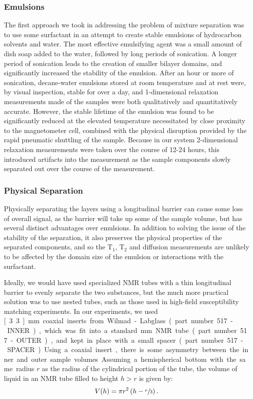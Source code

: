 \documentclass[PaulGanssle-Thesis.tex]{subfiles}
\begin{document}
\subsubsection{Emulsions}
\label{Section:Relaxation-Diffusion-Hydrocarbons-Mixtures-Emulsions}
The first approach we took in addressing the problem of mixture separation was to use some surfactant in an attempt to create stable emulsions of hydrocarbon solvents and water. The most effective emulsifying agent was a small amount of dish soap added to the water, followed by long periods of sonication. A longer period of sonication leads to the creation of smaller bilayer domains, and significantly increased the stability of the emulsion. After an hour or more of sonication, decane-water emulsions stored at room temperature and at rest were, by visual inspection, stable for over a day, and 1-dimensional relaxation measurements made of the samples were both qualitatively and quantitatively accurate. However, the stable lifetime of the emulsion was found to be significantly reduced at the elevated temperature necessitated by close proximity to the magnetometer cell, combined with the physical disruption provided by the rapid pneumatic shuttling of the sample. Because in our system 2-dimensional relaxation measurements were taken over the course of 12-24 hours, this introduced artifacts into the measurement as the sample components slowly separated out over the course of the measurement.

\subsubsection{Physical Separation}
\label{Section:Relaxation-Diffusion-Hydrocarbons-Mixtures-PhysicalSeparation}
Physically separating the layers using a longitudinal barrier can cause some loss of overall signal, as the barrier will take up some of the sample volume, but has several distinct advantages over emulsions. In addition to solving the issue of the stability of the separation, it also preserves the physical properties of the separated components, and so the T$_1$, T$_2$ and diffusion measurements are unlikely to be affected by the domain size of the emulsion or interactions with the surfactant.

Ideally, we would have used specialized NMR tubes with a thin longitudinal barrier to evenly separate the two substances, but the much more practical solution was to use nested tubes, such as those used in high-field susceptibility matching experiments. In our experiments, we used \unit[3.3]{mm} coaxial inserts from Wilmad-Labglass (part number 517-INNER), which was fit into a standard \unit[5]{mm} NMR tube (part number 517-OUTER), and kept in place with a small spacer (part number 517-SPACER). Using a coaxial insert, there is some asymmetry between the inner and outer sample volumes. Assuming a hemispherical bottom with the same radius $r$ as the radius of the cylindrical portion of the tube, the volume of liquid in an NMR tube filled to height $h > r$ is given by:
\begin{equation}
V(h) = \pi{}r^2\left(h-\sfrac{r}{3}\right).
\label{eqn:VolumeAnyTube}
\end{equation}
\end{document}
